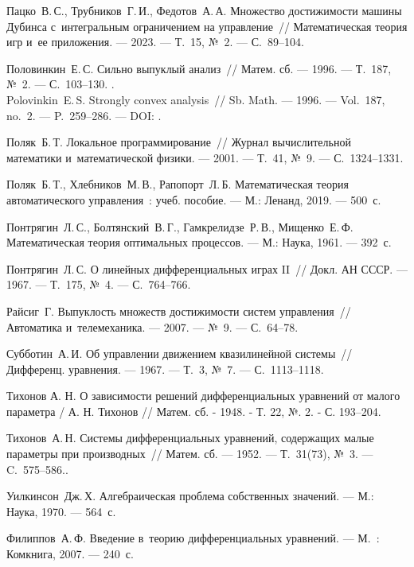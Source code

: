 \documentclass[../main.tex]{subfiles}
\begin{document}
\begin{thebibliography}{99}
Пацко~В.\,С., Трубников~Г.\,И., Федотов~А.\,А. Множество достижимости машины Дубинса с~интегральным ограничением на управление~// Математическая теория игр и~ее приложения. --- 2023. --- Т.~15, №~2. --- С.~89--104.

Половинкин~Е.\,С. Сильно выпуклый анализ~// Матем. сб. --- 1996. --- Т.~187, №~2. --- С.~103--130.
 .
\\
Polovinkin~E.\,S. Strongly convex analysis~// Sb. Math. --- 1996. --- Vol.~187, no.~2. --- P.~259--286. --- DOI: .

Поляк~Б.\,Т. Локальное программирование~// Журнал вычислительной математики и~математической физики. --- 2001. --- Т.~41, №~9. --- С.~1324--1331.

Поляк~Б.\,Т., Хлебников~М.\,В., Рапопорт~Л.\,Б. Математическая теория автоматического управления~: учеб. пособие. --- М.: Ленанд, 2019. --- 500~с.

Понтрягин~Л.\,С., Болтянский~В.\,Г., Гамкрелидзе~Р.\,В., Мищенко~Е.\,Ф. Математическая теория оптимальных процессов. --- М.: Наука, 1961. --- 392~с.

Понтрягин~Л.\,С. О линейных дифференциальных играх II~// Докл. АН СССР. --- 1967. --- Т.~175, №~4. --- С.~764--766.


Райсиг~Г. Выпуклость множеств достижимости систем управления~// Автоматика и~телемеханика. --- 2007. --- №~9. --- С.~64--78.

Субботин~А.\,И. Об управлении движением квазилинейной системы~// Дифференц. уравнения. --- 1967. --- Т.~3, №~7. --- С.~1113--1118.

Тихонов А. Н. О зависимости решений дифференциальных уравнений от малого параметра / А. Н. Тихонов // Матем. сб. - 1948. - Т. 22, №. 2. - С. 193–204.

Тихонов~А.\,Н. Системы дифференциальных уравнений, содержащих малые параметры при производных~// Матем. сб. --- 1952. --- Т.~31(73), №~3. --- C.~575--586..

Уилкинсон~Дж.\,Х. Алгебраическая проблема собственных значений. --- М.: Наука, 1970. --- 564~с.

Филиппов~А.\,Ф. Введение в~теорию дифференциальных уравнений. --- М.~: Комкнига, 2007. --- 240~с.


\end{thebibliography}
\end{document}
